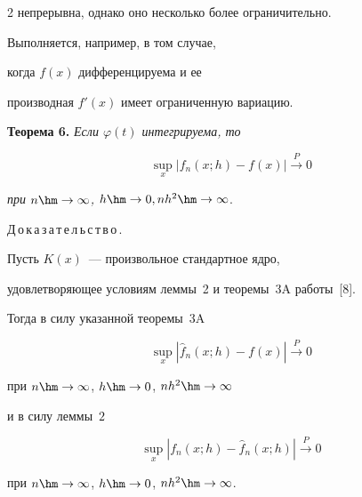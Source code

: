 \begin{multicols}{2}
непрерывна, однако оно несколько более ограничительно.

Выполняется, например, в том случае,

когда $f(x)$ дифференцируема и ее

производная $f'(x)$ имеет ограниченную вариацию.

\pagebreak






\noindent

\textbf{Теорема 6.} \textit{Если $\varphi(t)$ интегрируема, то}

\begin{equation}

\sup\limits_x|f_n(x;h)-f(x)|\xrightarrow{P} 0

\label{e15-u1}

\end{equation}

\textit{при $n\hm\to\infty$, $h\hm\to0, nh^2\hm\to\infty$}.



\medskip



\noindent

Д\,о\,к\,а\,з\,а\,т\,е\,л\,ь\,с\,т\,в\,о\,.\ 

Пусть $K(x)$~--- произвольное стандартное ядро,

удовлетворяющее условиям леммы~2 и теоремы~3A  работы~[8].

Тогда в силу указанной теоремы~3A

\begin{equation}

\sup\limits_x \left\vert\hat f_n(x;h)-f(x)\right\vert

\xrightarrow{P} 0

\label{e16-u1}

\end{equation}

при $n\hm\to\infty$, $h\hm\to0$, $nh^2\hm\to\infty$

и в силу леммы~$2$

\begin{equation}

\sup\limits_x|f_n(x;h)-\hat f_n(x;h)|\xrightarrow{P} 0

\label{e17-u1}

\end{equation}

при $n\hm\to\infty$, $h\hm\to0$, $nh^2\hm\to\infty$.


\end{multicols}
